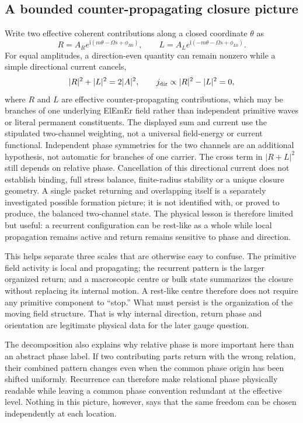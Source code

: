 \documentclass[11pt]{article}
\theoremstyle{definition}
\newcommand{\ii}{\mathrm{i}}
\begin{document}
\subsection{A bounded counter-propagating closure picture}

Write two effective coherent contributions along a closed coordinate $\theta$ as
\begin{equation}
 R=A_R e^{\ii(m\theta-\Omega s+\phi_{R0})},
 \qquad
 L=A_L e^{\ii(-m\theta-\Omega s+\phi_{L0})}.
 \label{eq:bounded_counterflow_picture}
\end{equation}
For equal amplitudes, a direction-even quantity can remain nonzero while a simple directional current cancels,
\begin{equation}
 |R|^2+|L|^2=2|A|^2,
 \qquad
 j_{\rm dir}\propto |R|^2-|L|^2=0,
 \label{eq:balanced_counterflow}
\end{equation}
where $R$ and $L$ are effective counter-propagating contributions, which may
be branches of one underlying ElEmEr field rather than independent primitive
waves or literal permanent constituents.  The displayed sum and current use
the stipulated two-channel weighting, not a universal field-energy or current
functional.  Independent phase symmetries for the two channels are an
additional hypothesis, not automatic for branches of one carrier.  The cross term in $|R+L|^2$ still depends on relative phase.  Cancellation of this directional current does not establish binding, full
stress balance, finite-radius stability or a unique closure geometry.
A single packet returning and overlapping itself is a separately investigated
possible formation picture; it is not identified with, or proved to produce,
the balanced two-channel state.  The physical lesson is therefore limited but useful: a recurrent configuration can be rest-like as a whole while local propagation remains active and return remains sensitive to phase and direction.

This helps separate three scales that are otherwise easy to confuse.  The primitive field activity is local and propagating; the recurrent pattern is the larger organized return; and a macroscopic centre or bulk state summarizes the closure without replacing its internal motion.  A rest-like centre therefore does not require any primitive component to ``stop.''  What must persist is the organization of the moving field structure.  That is why internal direction, return phase and orientation are legitimate physical data for the later gauge question.

The decomposition also explains why relative phase is more important here than an abstract phase label.  If two contributing parts return with the wrong relation, their combined pattern changes even when the common phase origin has been shifted uniformly.  Recurrence can therefore make relational phase physically readable while leaving a common phase convention redundant at the effective level.  Nothing in this picture, however, says that the same freedom can be chosen independently at each location.
\end{document}
